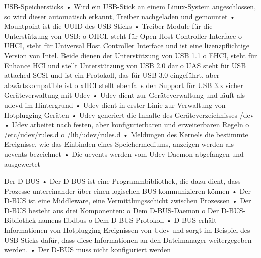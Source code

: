 USB-Speichersticks
• Wird ein USB-Stick an einem Linux-System angeschlossen, so wird dieser automatisch
erkannt, Treiber nachgeladen und gemountet
• Mountpoint ist die UUID des USB-Sticks
• Treiber-Module für die Unterstützung von USB:
o OHCI, steht für Open Host Controller Interface
o UHCI, steht für Universal Host Controller Interface und ist eine lizenzpflichtige
Version von Intel. Beide dienen der Unterstützung von USB 1.1
o EHCI, steht für Enhance HCI und stellt Unterstützung von USB 2.0 dar
o UAS steht für USB attached SCSI und ist ein Protokoll, das für USB 3.0 eingeführt,
aber abwärtskompatible ist
o xHCI stellt ebenfalls den Support für USB 3.x sicher
Geräteverwaltung mit Udev
• Udev dient zur Geräteverwaltung und läuft als udevd im Hintergrund
• Udev dient in erster Linie zur Verwaltung von Hotplugging-Geräten
• Udev generiert die Inhalte des Geräteverzeichnisses /dev
• Udev arbeitet nach festen, aber konfigurierbaren und erweiterbaren Regeln
o /etc/udev/rules.d
o /lib/udev/rules.d
• Meldungen des Kernels die bestimmte Ereignisse, wie das Einbinden eines Speichermediums,
anzeigen werden als uevents bezeichnet
• Die uevents werden vom Udev-Daemon abgefangen und ausgewertet 

Der D-BUS
• Der D-BUS ist eine Programmbibliothek, die dazu dient, dass Prozesse untereinander über
einen logischen BUS kommunizieren können
• Der D-BUS ist eine Middleware, eine Vermittlungsschicht zwischen Prozessen
• Der D-BUS besteht aus drei Komponenten:
o Dem D-BUS-Daemon
o Der D-BUS-Bibliothek namens libdbus
o Dem D-BUS-Protokoll
• D-BUS erhält Informationen von Hotplugging-Ereignissen von Udev und sorgt im Beispiel des
USB-Sticks dafür, dass diese Informationen an den Dateimanager weitergegeben werden.
• Der D-BUS muss nicht konfiguriert werden 